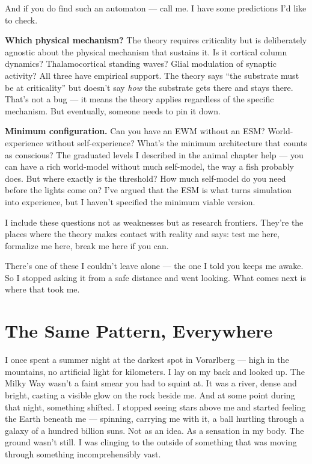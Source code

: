 \documentclass[11pt, twoside, openright]{book}
\begin{document}
And if you do find such an automaton --- call me. I have some predictions I'd like to check.

\textbf{Which physical mechanism?} The theory requires criticality but is deliberately agnostic about the physical mechanism that sustains it. Is it cortical column dynamics? Thalamocortical standing waves? Glial modulation of synaptic activity? All three have empirical support. The theory says ``the substrate must be at criticality'' but doesn't say \textit{how} the substrate gets there and stays there. That's not a bug --- it means the theory applies regardless of the specific mechanism. But eventually, someone needs to pin it down.

\textbf{Minimum configuration.} Can you have an EWM without an ESM? World-experience without self-experience? What's the minimum architecture that counts as conscious? The graduated levels I described in the animal chapter help --- you can have a rich world-model without much self-model, the way a fish probably does. But where exactly is the threshold? How much self-model do you need before the lights come on? I've argued that the ESM is what turns simulation into experience, but I haven't specified the minimum viable version.

I include these questions not as weaknesses but as research frontiers. They're the places where the theory makes contact with reality and says: test me here, formalize me here, break me here if you can.

There's one of these I couldn't leave alone --- the one I told you keeps me awake. So I stopped asking it from a safe distance and went looking. What comes next is where that took me.


\chapter{The Same Pattern, Everywhere}

I once spent a summer night at the darkest spot in Vorarlberg --- high in the mountains, no artificial light for kilometers. I lay on my back and looked up. The Milky Way wasn't a faint smear you had to squint at. It was a river, dense and bright, casting a visible glow on the rock beside me. And at some point during that night, something shifted. I stopped seeing stars above me and started feeling the Earth beneath me --- spinning, carrying me with it, a ball hurtling through a galaxy of a hundred billion suns. Not as an idea. As a sensation in my body. The ground wasn't still. I was clinging to the outside of something that was moving through something incomprehensibly vast.
\end{document}
